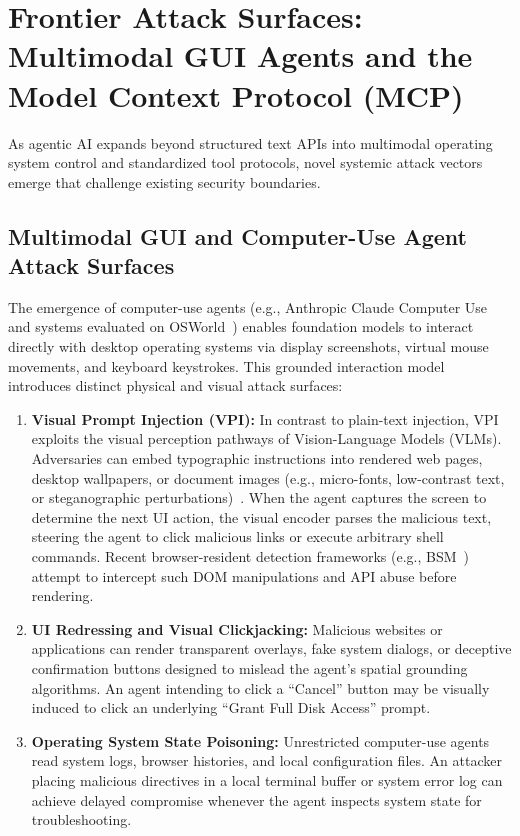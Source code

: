 \section{Frontier Attack Surfaces: Multimodal GUI Agents and the Model Context Protocol (MCP)}
\label{sec:modality_mcp}

As agentic AI expands beyond structured text APIs into multimodal operating system control and standardized tool protocols, novel systemic attack vectors emerge that challenge existing security boundaries.

\subsection{Multimodal GUI and Computer-Use Agent Attack Surfaces}
\label{subsec:gui_agents}

The emergence of computer-use agents (e.g., Anthropic Claude Computer Use and systems evaluated on OSWorld~\cite{xie2024osworld}) enables foundation models to interact directly with desktop operating systems via display screenshots, virtual mouse movements, and keyboard keystrokes. This grounded interaction model introduces distinct physical and visual attack surfaces:

\begin{enumerate}
    \item \textbf{Visual Prompt Injection (VPI):} In contrast to plain-text injection, VPI exploits the visual perception pathways of Vision-Language Models (VLMs). Adversaries can embed typographic instructions into rendered web pages, desktop wallpapers, or document images (e.g., micro-fonts, low-contrast text, or steganographic perturbations)~\cite{gu2024agent}. When the agent captures the screen to determine the next UI action, the visual encoder parses the malicious text, steering the agent to click malicious links or execute arbitrary shell commands. Recent browser-resident detection frameworks (e.g., BSM~\cite{vadlamani2026bsm}) attempt to intercept such DOM manipulations and API abuse before rendering.
    \item \textbf{UI Redressing and Visual Clickjacking:} Malicious websites or applications can render transparent overlays, fake system dialogs, or deceptive confirmation buttons designed to mislead the agent's spatial grounding algorithms. An agent intending to click a ``Cancel'' button may be visually induced to click an underlying ``Grant Full Disk Access'' prompt.
    \item \textbf{Operating System State Poisoning:} Unrestricted computer-use agents read system logs, browser histories, and local configuration files. An attacker placing malicious directives in a local terminal buffer or system error log can achieve delayed compromise whenever the agent inspects system state for troubleshooting.
\end{enumerate}

